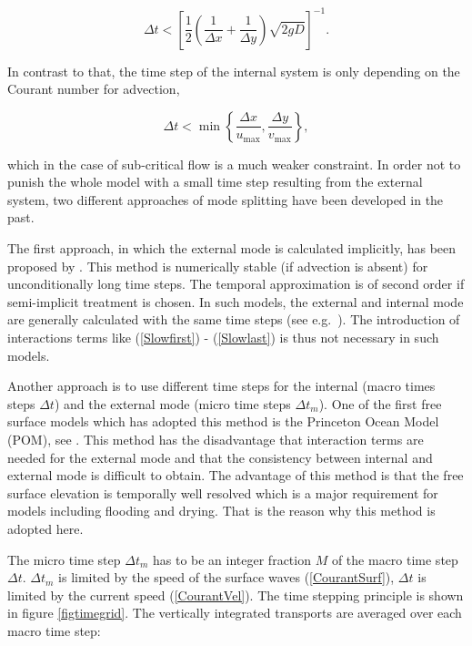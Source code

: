 \begin{equation}\label{CourantSurf}
\Delta t < \left[\frac12 \left(\frac{1}{\Delta x}+\frac{1}{\Delta y}\right)
\sqrt{2gD}\right]^{-1}.
\end{equation}

In contrast to that, the time step of the internal system
is only depending on the Courant number for advection,

\begin{equation}\label{CourantVel}
\Delta t < \min\left\{\frac{\Delta x}{u_{\max}},\frac{\Delta y}{v_{\max}}
\right\},
\end{equation}

which in the case of sub-critical flow is a much weaker
constraint. In order not to punish the whole model with a small
time step resulting from the external system, two different approaches
of mode splitting have been developed in the past.

The first approach, in which the external mode is calculated
implicitly, has been proposed by \cite{MADALAea77}.
This method
is numerically stable (if advection is absent)
for unconditionally long time steps.
The temporal approximation is of second order if semi-implicit
treatment is chosen. In such models, the external and internal mode are
generally calculated with the same time steps
(see e.g.\ \cite{BACKHAUS85}). The introduction of
interactions terms like (\ref{Slowfirst})
- (\ref{Slowlast}) is thus not necessary in such models.

Another approach is to use different time steps for the internal
(macro times steps $\Delta t$)
and the external mode \label{dtm} (micro time steps $\Delta t_m$).
One of the first free surface models which has adopted this method is the
Princeton Ocean Model (POM), see \cite{BLUMBERGea87}.
This method has the disadvantage that interaction
terms are needed for the external mode and that the consistency
between internal and external mode is difficult to obtain.
The advantage of this method is that the free surface elevation is
temporally well resolved which is a major requirement for models
including flooding and drying. That is the reason why this
method is adopted here.

The micro time step $\Delta t_m$ has to be an integer fraction $M$ of the
macro time step $\Delta t$. $\Delta t_m$ is limited by the speed of the
surface waves (\ref{CourantSurf}),
$\Delta t$ is limited by the current speed (\ref{CourantVel}).
The time stepping principle is shown in figure \ref{figtimegrid}.
The vertically integrated transports are averaged over each macro time
step:


